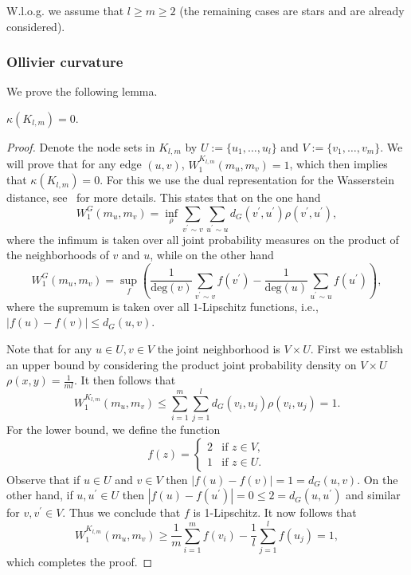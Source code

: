 \documentclass[runningheads]{llncs}
\begin{document}
W.l.o.g. we assume that $l \ge m \ge 2$ (the remaining cases are stars and are already considered). 

\subsubsection{Ollivier curvature}  
We prove the following lemma.

\begin{lemma}\label{lem:bipartite_ollivier}
$\kappa(K_{l,m}) = 0$.
\end{lemma}

\begin{proof}
Denote the node sets in $K_{l,m}$ by $U := \{u_1, \dots, u_l\}$ and $V := \{v_1, \dots, v_m\}$. We will prove that for any edge $(u, v)$, $W_1^{K_{l,m}}(m_{u},m_{v}) = 1$, which then implies that $\kappa(K_{l,m}) = 0$. For this we use the dual representation for the Wasserstein distance, see~\cite{ollivier2009ricci} for more details. This states that on the one hand
\[
	W^{G}_1(m_u,m_v) = \inf_{\rho} \sum_{v^\prime \sim v} \sum_{u^\prime \sim u} d_G(v^\prime, u^\prime) \rho(v^\prime, u^\prime),
\]
where the infimum is taken over all joint probability measures on the product of the neighborhoods of $v$ and $u$, while on the other hand
\[
	W^{G}_1(m_u,m_v) = \sup_{f} \left( \frac{1}{\mathrm{deg}(v) }\sum_{v^\prime \sim v} f(v^\prime) - \frac{1}{\mathrm{deg}(u) }\sum_{u^\prime \sim u} f(u^\prime)\right),
\]
where the supremum is taken over all $1$-Lipschitz functions, i.e., $|f(u) - f(v)| \le d_G(u,v)$.

Note that for any $u \in U, v \in V$ the joint neighborhood is $V \times U$. First we establish an upper bound by considering the product joint probability density on $V \times U$
$
	\rho(x,y) =	\frac{1}{m l}.
$
It then follows that
\[
	W_1^{K_{l,m}}(m_{u},m_{v}) \le \sum_{i = 1}^m \sum_{j = 1}^l d_G(v_i, u_j) \rho(v_i, u_j)
	= 1.
\]
For the lower bound, we define the function
\[
	f(z) = \begin{cases}
		2 &\mbox{if } z \in V,\\
		1 &\mbox{if } z \in U.
	\end{cases}
\]
Observe that if $u \in U$ and $v \in V$ then $|f(u) - f(v)| = 1 = d_G(u,v)$. On the other hand, if $u, u^\prime \in U$ then $|f(u) - f(u^\prime)| = 0 \le 2 = d_G(u,u^\prime)$ and similar for $v, v^\prime \in V$. Thus we conclude that $f$ is 1-Lipschitz. It now follows that
\[
	W_1^{K_{l,m}}(m_u,m_v) \ge \frac{1}{m} \sum_{i = 1}^m f(v_i) - \frac{1}{l} \sum_{j = 1}^l f(u_j) = 1,
\]
which completes the proof.
\end{proof}
\end{document}
